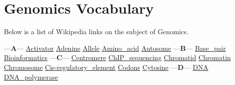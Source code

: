 \chapter{Genomics Vocabulary}
\label{ch-genomics-vocab}

Below is a list of Wikipedia links on the subject of Genomics.



\setlength{\columnsep}{1.5cm}
\begin{multicols}{3}
\noindent
---{\bf A}---\newline
\href{https://en.wikipedia.org/wiki/Activator_(genetics)}{Activator}\newline
\href{https://en.wikipedia.org/wiki/Adenine}{Adenine}\newline
\href{https://en.wikipedia.org/wiki/Allele}{Allele}\newline
\href{https://en.wikipedia.org/wiki/Amino_acid}{Amino\_acid}\newline
\href{https://en.wikipedia.org/wiki/Autosome}{Autosome}\newline
---{\bf B}---\newline
\href{https://en.wikipedia.org/wiki/Base_pair}{Base\_pair}\newline
\href{https://en.wikipedia.org/wiki/Bioinformatics}{Bioinformatics}\newline
---{\bf C}---\newline
\href{https://en.wikipedia.org/wiki/Centromere}{Centromere}\newline
\href{https://en.wikipedia.org/wiki/ChIP_sequencing}{ChIP\_sequencing}\newline
\href{https://en.wikipedia.org/wiki/Chromatid}{Chromatid}\newline
\href{https://en.wikipedia.org/wiki/Chromatin}{Chromatin}\newline
\href{https://en.wikipedia.org/wiki/Chromosome}{Chromosome}\newline
\href{https://en.wikipedia.org/wiki/Cis-regulatory_element}{Cis-regulatory\_element}\newline
\href{https://en.wikipedia.org/wiki/Genetic_code#Codons}{Codons}\newline
\href{https://en.wikipedia.org/wiki/Cytosine}{Cytosine}\newline
---{\bf D}---\newline
\href{https://en.wikipedia.org/wiki/DNA}{DNA}\newline
\href{https://en.wikipedia.org/wiki/DNA_polymerase}{DNA\_polymerase}\newline

\end{multicols}

